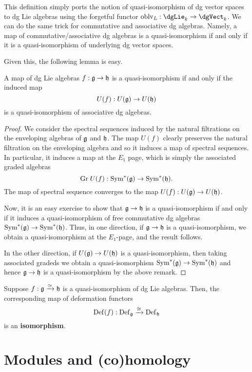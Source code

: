 \documentclass[11pt]{amsart}
\begin{document}
This definition simply ports the notion of quasi-isomorphism of dg vector spaces to dg Lie algebras using the forgetful functor $\oblv_L : \dgLie_k \to \dgVect_k$. 
We can do the same trick for commutative and associative dg algebras.
Namely, a map of commutative/associative dg algebras is a quasi-isomorphism if and only if it is a quasi-isomorphism of underlying dg vector spaces. 

Given this, the following lemma is easy. 

\begin{lem}
A map of dg Lie algebras $f : \mathfrak g \to \mathfrak h$ is a quasi-isomorphism if and only if the induced map
\[
U(f) : U(\mathfrak g) \to U(\mathfrak h)
\]
is a quasi-isomorphism of associative dg algebras. 
\end{lem}
\begin{proof}
We consider the spectral sequences induced by the natural filtrations on the enveloping algebras of $\mathfrak g$ and $\mathfrak h$. 
The map $U(f)$ clearly preserves the natural filtration on the enveloping algebra and so it induces a map of spectral sequences. 
In particular, it induces a map at the $E_1$ page, which is simply the associated graded algebras
\[
{\rm Gr} \; U(f) : {\rm Sym}^*(\mathfrak g) \to {\rm Sym}^*(\mathfrak h) .
\] 
The map of spectral sequence converges to the map $U(f) : U(\mathfrak g) \to U(\mathfrak h)$. 

Now, it is an easy exercise to show that $\mathfrak g \to \mathfrak h$ is a quasi-isomorphism if and only if it induces a quasi-isomorphism of free commutative dg algebras ${\rm Sym}^*(\mathfrak g) \to {\rm Sym}^*(\mathfrak h)$. 
Thus, in one direction, if $\mathfrak g \to \mathfrak h$ is a quasi-isomorphism, we obtain a quasi-isomorphism at the $E_1$-page, and the result follows. 

In the other direction, if $U(\mathfrak g) \to U(\mathfrak h)$ is a quasi-isomorphism, then taking associated gradeds we obtain a quasi-isomorphism ${\rm Sym}^*(\mathfrak g) \to {\rm Sym}^*(\mathfrak h)$ and hence $\mathfrak g \to \mathfrak h$ is a quasi-isomorphism by the above remark. 
\end{proof}

\begin{thm}
Suppose $f : \mathfrak g \xrightarrow{\simeq} \mathfrak h$ is a quasi-isomorphism of dg Lie algebras. 
Then, the corresponding map of deformation functors
\[
{\rm Def}(f) : {\rm Def}_\mathfrak g \xrightarrow{\cong} {\rm Def}_\mathfrak h
\]
is an {\bf isomorphism}. 
\end{thm}


\section{Modules and (co)homology}
\end{document}
